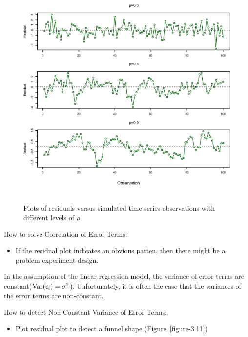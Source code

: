\documentclass[12pt,a4paper]{article}%
\theoremstyle{definition}
\theoremstyle{plain}
\numberwithin{equation}{section}
\newcounter{subsubsubsection}[subsubsection]
\begin{document}
\begin{figure}[H]
\centering
\includegraphics[scale=0.85]{images//3_10.eps}
\\~\\
\caption{Plots of residuals versus simulated time series observations with different levels of $\rho$}\label{figure-3.10}
\end{figure}

How to solve Correlation of Error Terms:
\begin{itemize}
\item If the residual plot indicates an obvious patten, then there might be a problem experiment design.
\end{itemize}

\subsubsubsection{\color{blue}{Non-Constant Variance of Error Terms(Heteroscedasticity)}}
In the assumption of the linear regression model, the variance of error terms are constant(${\rm Var}(\epsilon_{i})=\sigma^{2}$).
Unfortunately, it is often the case that the variances of the error terms are non-constant.

How to detect Non-Constant Variance of Error Terms:
\begin{itemize}
\item Plot residual plot to detect a funnel shape (Figure~\ref{figure-3.11})
\end{itemize}
\end{document}
